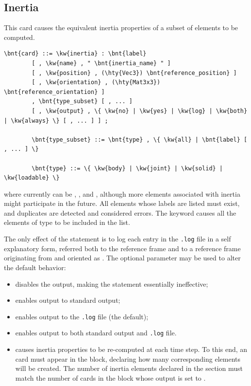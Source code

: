 \subsection{Inertia}\label{sec:EL:MISC:INERTIA}
This card causes the equivalent inertia properties of a subset
of elements to be computed.
\begin{Verbatim}[commandchars=\\\{\}]
    \bnt{card} ::= \kw{inertia} : \bnt{label}
        [ , \kw{name} , " \bnt{inertia_name} " ]
        [ , \kw{position} , (\hty{Vec3}) \bnt{reference_position} ]
        [ , \kw{orientation} , (\hty{Mat3x3}) \bnt{reference_orientation} ]
        , \bnt{type_subset} [ , ... ]
        [ , \kw{output} , \{ \kw{no} | \kw{yes} | \kw{log} | \kw{both} | \kw{always} \} [ , ... ] ] ;

        \bnt{type_subset} ::= \bnt{type} , \{ \kw{all} | \bnt{label} [ , ... ] \}

        \bnt{type} ::= \{ \kw{body} | \kw{joint} | \kw{solid} | \kw{loadable} \}
\end{Verbatim}
where  currently can be , ,  and ,
although more elements associated with inertia might participate in the future.
All elements whose labels are listed must exist, and duplicates
are detected and considered errors.
The keyword  causes all the elements of type 
to be included in the list.

\noindent
The only effect of the  statement is to log
each  entry in the \texttt{.log} file in a self explanatory form,
referred both to the  reference frame and to a reference frame
originating from  and oriented
as .
The optional parameter  may be used to alter the default
behavior:
\begin{itemize}
\item {} disables the output, making the 
statement essentially ineffective;
\item {} enables output to standard output;
\item {} enables output to the \texttt{.log} file (the default);
\item {} enables output to both standard output and \texttt{.log} file.
\item {} causes inertia properties to be re-computed at each time step.
To this end, an  card must appear in the  block,
declaring how many corresponding  elements will be created.
The number of inertia elements declared in the  section must match
the number of  cards in the  block whose output is set to .
\end{itemize}

